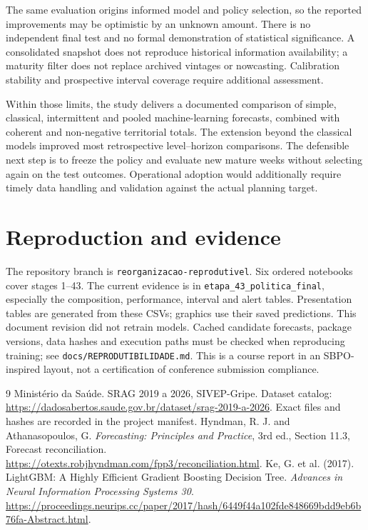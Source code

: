 \documentclass[12pt,a4paper]{article}
\begin{document}
The same evaluation origins informed model and policy selection, so the reported improvements may be optimistic by an unknown amount. There is no independent final test and no formal demonstration of statistical significance. A consolidated snapshot does not reproduce historical information availability; a maturity filter does not replace archived vintages or nowcasting. Calibration stability and prospective interval coverage require additional assessment.

Within those limits, the study delivers a documented comparison of simple, classical, intermittent and pooled machine-learning forecasts, combined with coherent and non-negative territorial totals. The extension beyond the classical models improved most retrospective level--horizon comparisons. The defensible next step is to freeze the policy and evaluate new mature weeks without selecting again on the test outcomes. Operational adoption would additionally require timely data handling and validation against the actual planning target.

\section*{Reproduction and evidence}
The repository branch is \texttt{reorganizacao-reprodutivel}. Six ordered notebooks cover stages 1--43. The current evidence is in \texttt{etapa\_43\_politica\_final}, especially the composition, performance, interval and alert tables. Presentation tables are generated from these CSVs; graphics use their saved predictions. This document revision did not retrain models. Cached candidate forecasts, package versions, data hashes and execution paths must be checked when reproducing training; see \texttt{docs/REPRODUTIBILIDADE.md}. This is a course report in an SBPO-inspired layout, not a certification of conference submission compliance.

\begin{thebibliography}{9}
 Ministério da Saúde. SRAG 2019 a 2026, SIVEP-Gripe. Dataset catalog: \url{https://dadosabertos.saude.gov.br/dataset/srag-2019-a-2026}. Exact files and hashes are recorded in the project manifest.
 Hyndman, R. J. and Athanasopoulos, G. \emph{Forecasting: Principles and Practice}, 3rd ed., Section 11.3, Forecast reconciliation. \url{https://otexts.robjhyndman.com/fpp3/reconciliation.html}.
 Ke, G. et al. (2017). LightGBM: A Highly Efficient Gradient Boosting Decision Tree. \emph{Advances in Neural Information Processing Systems 30}. \url{https://proceedings.neurips.cc/paper/2017/hash/6449f44a102fde848669bdd9eb6b76fa-Abstract.html}.
\end{thebibliography}
\end{document}
